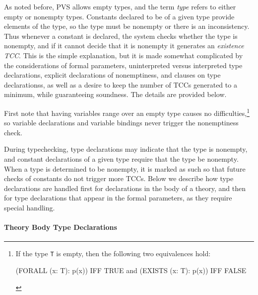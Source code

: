 As noted before, PVS allows empty types, and the term \emph{type} refers
to either empty or nonempty types.  Constants declared to be of a given
type provide elements of the type, so the type must be nonempty or there
is an inconsistency.  Thus whenever a constant is declared, the system
checks whether the type is nonempty, and if it cannot decide that it is
nonempty it generates an \emph{existence TCC}. This is the simple explanation, but it is made
somewhat complicated by the considerations of formal parameters,
uninterpreted versus interpreted type declarations, explicit declarations
of nonemptiness, and
 clauses on type
declarationss, as well as a desire to keep the number of TCCs generated to
a minimum, while guaranteeing soundness.  The details are provided below.

First note that having variables range over an empty type causes no
difficulties,\footnote{If the type \texttt{T} is empty, then the following
two equivalences hold:
\begin{pvsex}
  (FORALL (x: T): p(x)) IFF TRUE \quad \mbox{\textrm{and}} \quad (EXISTS (x: T): p(x)) IFF FALSE
\end{pvsex}}
so variable declarations and variable bindings never trigger the
nonemptiness check.

During typechecking, type declarations may indicate that the type is
nonempty, and constant declarations of a given type require that the type
be nonempty.  When a type is determined to be nonempty, it is marked as
such so that future checks of constants do not trigger more TCCs.  Below
we describe how type declarations are handled first for declarations in the
body of a theory, and then for type declarations that appear in the formal
parameters, as they require special handling.

\paragraph{Theory Body Type Declarations}

